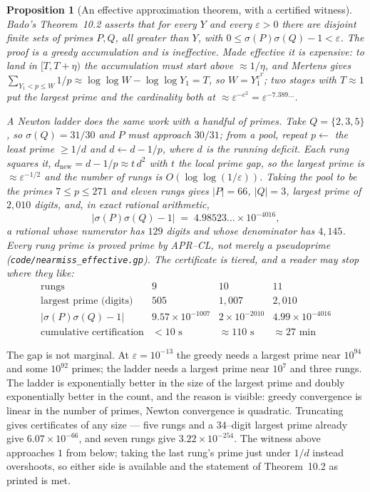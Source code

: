 \documentclass[11pt]{article}
\newtheorem{proposition}[theorem]{Proposition}
\theoremstyle{definition}
\begin{document}
\begin{proposition}[An effective approximation theorem, with a certified witness]\label{prop:effapprox}
Bado's Theorem~10.2 \cite{Bado2026} asserts that for every $Y$ and every $\varepsilon>0$ there are
disjoint finite sets of primes $P,Q$, all greater than $Y$, with $0\le\sigma(P)\sigma(Q)-1<
\varepsilon$. The proof is a greedy accumulation and is ineffective. Made effective it is expensive:
to land in $[T,T+\eta)$ the accumulation must start above $\approx1/\eta$, and Mertens gives
$\sum_{Y_1<p\le W}1/p\approx\log\log W-\log\log Y_1=T$, so $W=Y_1^{e^{T}}$; two stages with
$T\approx1$ put the largest prime and the cardinality both at $\approx\varepsilon^{-e^{2}}=
\varepsilon^{-7.389\ldots}$.

A Newton ladder does the same work with a handful of primes. Take $Q=\{2,3,5\}$, so
$\sigma(Q)=31/30$ and $P$ must approach $30/31$; from a pool, repeat $p\leftarrow$ the least prime
$\ge1/d$ and $d\leftarrow d-1/p$, where $d$ is the running deficit. Each rung squares it,
$d_{\mathrm{new}}=d-1/p\approx t\,d^{2}$ with $t$ the local prime gap, so the largest prime is
$\approx\varepsilon^{-1/2}$ and the number of rungs is $O(\log\log(1/\varepsilon))$. Taking the pool
to be the primes $7\le p\le271$ and eleven rungs gives $|P|=66$, $|Q|=3$, largest prime of $2{,}010$
digits, and, in exact rational arithmetic,
\[ \bigl|\sigma(P)\sigma(Q)-1\bigr|\;=\;4.98523\ldots\times10^{-4016}, \]
a rational whose numerator has $129$ digits and whose denominator has $4{,}145$. Every rung prime is
\emph{proved} prime by \textup{APR--CL}, not merely a pseudoprime
\textup{(\texttt{code/nearmiss\_effective.gp})}. The certificate is tiered, and a reader may stop
where they like:
\[
\begin{array}{l|ccc}
\text{rungs} & 9 & 10 & 11\\\hline
\text{largest prime (digits)} & 505 & 1{,}007 & 2{,}010\\
\bigl|\sigma(P)\sigma(Q)-1\bigr| & 9.57\times10^{-1007} & 2\times10^{-2010} &
  4.99\times10^{-4016}\\
\text{cumulative certification} & <10\text{ s} & \approx110\text{ s} & \approx27\text{ min}
\end{array}
\]
\end{proposition}

The gap is not marginal. At $\varepsilon=10^{-13}$ the greedy needs a largest prime near $10^{94}$
and some $10^{92}$ primes; the ladder needs a largest prime near $10^{7}$ and three rungs. The
ladder is exponentially better in the size of the largest prime and doubly exponentially better in
the count, and the reason is visible: greedy convergence is linear in the number of primes, Newton
convergence is quadratic. Truncating gives certificates of any size --- five rungs and a $34$--digit
largest prime already give $6.07\times10^{-66}$, and seven rungs give $3.22\times10^{-254}$. The witness above approaches $1$ from below; taking
the last rung's prime just under $1/d$ instead overshoots, so either side is available and the
statement of Theorem~10.2 as printed is met.
\end{document}
